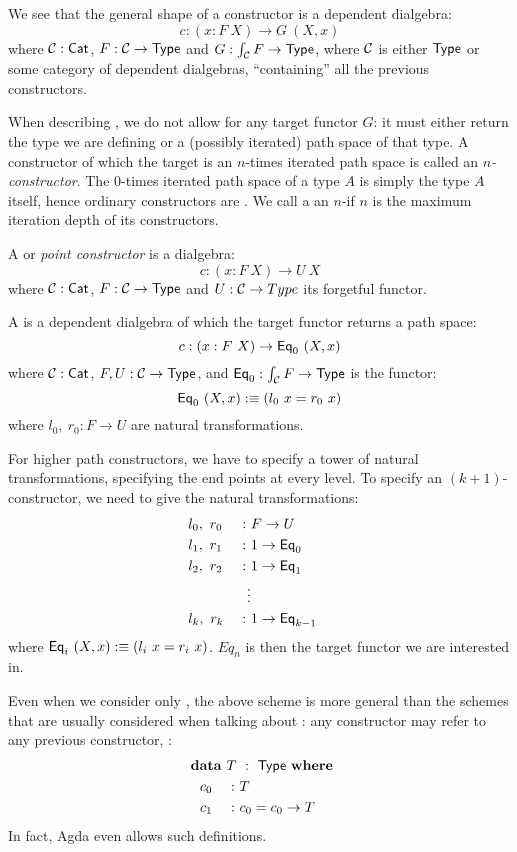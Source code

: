 \documentclass[a4paper,10pt]{article}
\begin{document}
We see that the general shape of a constructor is a dependent dialgebra:
$$
c : (x : F\ X) \to G\ (X , x)
$$
where $\mathcal{C} : \mathsf{Cat}$, $F : \mathcal{C} \to \mathsf{Type}$ and
$G : \int_{\mathcal{C}} F \to \mathsf{Type}$, where $\mathcal{C}$ is either $\mathsf{Type}$ or some
category of dependent dialgebras, ``containing'' all the previous
constructors.

When describing \hits, we do not allow for any target functor $G$: it
must either return the type we are defining or a (possibly iterated)
path space of that type. A constructor of which the target is an
$n$-times iterated path space is called an \emph{$n$-constructor}. The
$0$-times iterated path space of a type $A$ is simply the type $A$
itself, hence ordinary constructors are \zeroconstructors. We call a
\hit an $n$-\hit if $n$ is the maximum iteration depth of its
constructors.

A \emph{\zeroconstructor} or \emph{point constructor} is a dialgebra:
$$
c : (x : F\ X) \to U\ X
$$
where $\mathcal{C} : \mathsf{Cat}$, $F : \mathcal{C} \to \mathsf{Type}$ and $U : \mathcal{C} \to Type$ its forgetful
functor.

A \emph{\oneconstructor} is a dependent dialgebra of which the target
functor returns a path space:
$$
  c : (x : F\ X) \to \mathsf{Eq}_0\ (X, x)
$$
where $\mathcal{C} : \mathsf{Cat}$, $F, U : \mathcal{C} \to \mathsf{Type}$, and $\mathsf{Eq}_0 : \int_{\mathcal{C}} F \to
\mathsf{Type}$ is the functor:
$$
  \mathsf{Eq}_0\ (X , x) :\equiv (l_0\ x = r_0\ x)
$$
where $l_0,\ r_0 : F \to U$ are natural transformations.

For higher path constructors, we have to specify a tower of natural
transformations, specifying the end points at every level. To specify
an $(k+1)$-constructor, we need to give the natural transformations:
%
\begin{alignat*}{5}
  &l_0,\ r_0  &\ :\ &F \to U& \\
  &l_1,\ r_1  &\ : \ &1 \to \mathsf{Eq}_0& \\
  &l_2,\ r_2  &\ : \ &1 \to \mathsf{Eq}_1& \\
  &           &\vdots&& \\
  &l_k,\ r_k  &\ : \ &1 \to \mathsf{Eq}_{k-1}&
\end{alignat*}
%
where $\mathsf{Eq}_i\ (X, x) :\equiv (l_i\ x = r_i\ x)$. $Eq_n$ is then the target
functor we are interested in.

Even when we consider only \zeroconstructors, the above scheme is more
general than the schemes that are usually considered when talking
about \oits: any constructor may refer to any previous
constructor, \eg:
%
\begin{alignat*}{5}
  &\rlap{$\data\ T\ :\ \Type\ \where$} \\
  &\ \ c_0 &\ :\ &T&\\
  &\ \ c_1 &\ :\ &c_0 = c_0 \to T&
\end{alignat*}
%
In fact, Agda even allows such definitions.
\end{document}
